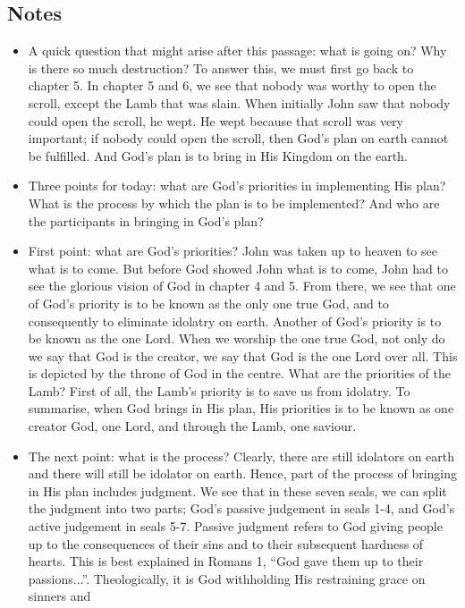 \subsection*{Notes}
\begin{itemize}
  \item{A quick question that might arise after this passage: what is going
  on?  Why is there so much destruction?  To answer this, we must first go
  back to chapter 5.  In chapter 5 and 6, we see that nobody was worthy to
  open the scroll, except the Lamb that was slain.  When initially John saw
  that nobody could open the scroll, he wept.  He wept because that scroll
  was very important; if nobody could open the scroll, then God's plan on
  earth cannot be fulfilled.  And God's plan is to bring in His Kingdom on
  the earth.  }
  \item{Three points for today: what are God's priorities in implementing His
  plan?  What is the process by which the plan is to be implemented?  And who
  are the participants in bringing in God's plan?}
  \item{First point: what are God's priorities?  John was taken up to heaven
  to see what is to come.  But before God showed John what is to come, John
  had to see the glorious vision of God in chapter 4 and 5.  From there, we
  see that one of God's priority is to be known as the only one true God, and
  to consequently to eliminate idolatry on earth.  Another of God's priority
  is to be known as the one Lord.  When we worship the one true God, not only
  do we say that God is the creator, we say that God is the one Lord over
  all.  This is depicted by the throne of God in the centre.  What are the
  priorities of the Lamb?  First of all, the Lamb's priority is to save us
  from idolatry.  To summarise, when God brings in His plan, His priorities
  is to be known as one creator God, one Lord, and through the Lamb, one
  saviour.}
  \item{The next point: what is the process?  Clearly, there are still
  idolators on earth and there will still be idolator on earth.  Hence,
  part of the process of bringing in His plan includes judgment.  We see that
  in these seven seals, we can split the judgment into two parts; God's
  passive judgement in seals 1-4, and God's active judgement in seals 5-7.
  Passive judgment refers to God giving people up to the consequences of
  their sins and to their subsequent hardness of hearts.  This is best
  explained in Romans 1, ``God gave them up to their passions...''.
  Theologically, it is God withholding His restraining grace on sinners and
}
\end{itemize}
